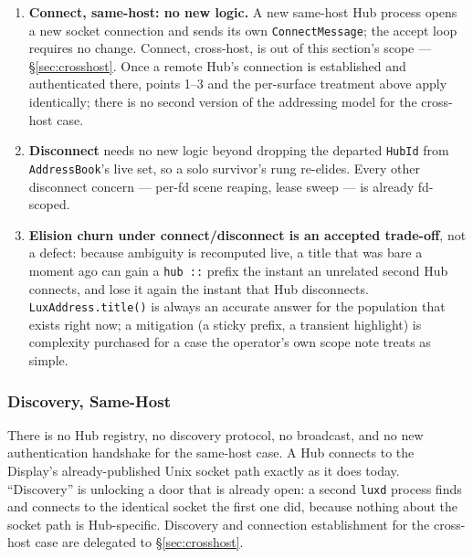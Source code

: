 \documentclass[a4paper,10pt]{article}
\newcommand{\tool}[1]{\texttt{#1}}
\newcommand{\msg}[1]{\texttt{#1}}
\begin{document}
\begin{enumerate}
    from Hub B's manifest handling's point of view, ``neither owned by the
    identifying fd nor named in the manifest'' --- exactly the purge
    condition, and exactly a cross-Hub data-loss hazard, not the
    orphan-sweep it was written for.  \textbf{Resolution: the purge
    predicate must be scoped by the sending Hub's own \texttt{HubId}, so a
    manifest disowns only scenes that Hub itself previously owned and no
    longer names, never another live Hub's.}  This is a required
    implementation step, coordinated with point 2's per-Hub-keyed storage
    and listed as \texttt{W14} in the increment-of-work document, not a
    property the current code already has.
  \item \textbf{Connect, same-host: no new logic.}  A new same-host Hub
    process opens a new socket connection and sends its own
    \msg{ConnectMessage}; the accept loop requires no change.  Connect,
    cross-host, is out of this section's scope --- \S\ref{sec:crosshost}.
    Once a remote Hub's connection is established and authenticated there,
    points 1--3 and the per-surface treatment above apply identically;
    there is no second version of the addressing model for the cross-host
    case.
  \item \textbf{Disconnect} needs no new logic beyond dropping the
    departed \texttt{HubId} from \texttt{AddressBook}'s live set, so a
    solo survivor's rung re-elides.  Every other disconnect concern ---
    per-fd scene reaping, lease sweep --- is already fd-scoped.
  \item \textbf{Elision churn under connect/disconnect is an accepted
    trade-off}, not a defect: because ambiguity is recomputed live, a
    title that was bare a moment ago can gain a \texttt{hub ::} prefix the
    instant an unrelated second Hub connects, and lose it again the
    instant that Hub disconnects.  \texttt{LuxAddress.title()} is always
    an accurate answer for the population that exists right now; a
    mitigation (a sticky prefix, a transient highlight) is complexity
    purchased for a case the operator's own scope note treats as simple.
\end{enumerate}

\subsubsection{Discovery, Same-Host}

There is no Hub registry, no discovery protocol, no broadcast, and no new
authentication handshake for the same-host case.  A Hub connects to the
Display's already-published Unix socket path exactly as it does today.
``Discovery'' is unlocking a door that is already open: a second
\tool{luxd} process finds and connects to the identical socket the first
one did, because nothing about the socket path is Hub-specific.  Discovery
and connection establishment for the cross-host case are delegated to
\S\ref{sec:crosshost}.
\end{document}

